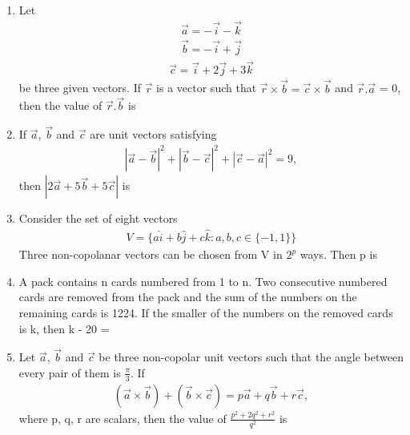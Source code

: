 \begin{enumerate}[label=\arabic*.,ref=\thesubsection.\theenumi]
\item Let 
\begin{align*}
\overrightarrow{a} = -\overrightarrow{i} - \overrightarrow{k}
\end{align*}
\begin{align*}
\overrightarrow{b} = -\overrightarrow{i} + \overrightarrow{j}
\end{align*}
\begin{align*}
\overrightarrow{c} = \overrightarrow{i} + 2\overrightarrow{j} + 3\overrightarrow{k}
\end{align*}
be three given vectors. If $\overrightarrow{r}$ is a vector such that $\overrightarrow{r} \times \overrightarrow{b} = \overrightarrow{c} \times \overrightarrow{b}$ and $\overrightarrow{r}.\overrightarrow{a}$ = 0, then the value of $\overrightarrow{r}.\overrightarrow{b}$ is

\item If $\overrightarrow{a}$, $\overrightarrow{b}$ and $\overrightarrow{c}$ are unit vectors satisfying
\begin{align*}
|\overrightarrow{a}-\overrightarrow{b}|^{2} + |\overrightarrow{b}-\overrightarrow{c}|^{2} + |\overrightarrow{c}-\overrightarrow{a}|^{2} = 9,
\end{align*}
then $|2\overrightarrow{a} + 5\overrightarrow{b} + 5\overrightarrow{c}|$ is

\item Consider the set of eight vectors
\begin{align*}
V = \{a\hat{i} + b\hat{j} + c\hat{k}:a, b, c \in \{-1, 1\}\}
\end{align*}
Three non-copolanar vectors can be chosen from V in $2^{p}$ ways. Then p is 

\item A pack contains n cards numbered from 1 to n. Two consecutive numbered cards are removed from the pack and the sum of the numbers on the remaining cards is 1224. If the smaller of the numbers on the removed cards is k, then k - 20 = 

\item Let $\overrightarrow{a}$, $\overrightarrow{b}$ and $\overrightarrow{c}$ be three non-copolar unit vectors such that the angle between every pair of them is $\frac{\pi}{3}$. If 
\begin{align*}
(\overrightarrow{a} \times \overrightarrow{b}) + (\overrightarrow{b} \times \overrightarrow{c}) = p\overrightarrow{a} + q\overrightarrow{b} + r\overrightarrow{c},
\end{align*}
where p, q, r are scalars, then the value of $\frac{p^{2} + 2q^{2} + r^{2}}{q^{2}}$ is


\end{enumerate}
